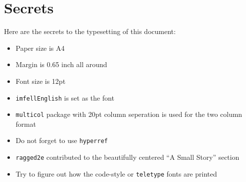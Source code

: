 \documentclass[12pt,a4paper]{article}
\begin{document}
\section*{Secrets}
Here are the secrets to the typesetting of this document:
\begin{itemize}
    \item Paper size is A4
    \item Margin is 0.65 inch all around
    \item Font size is 12pt
    \item \texttt{imfellEnglish} is set as the font
    \item \texttt{multicol} package with 20pt column seperation is used for the two column format
    \item Do not forget to use \texttt{hyperref}
    \item \texttt{ragged2e} contributed to the beautifully centered “A Small Story” section
    \item Try to figure out how the code-style or \texttt{teletype} fonts are printed
\end{itemize}
\end{document}
